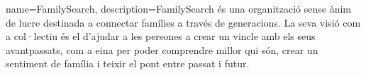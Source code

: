 {
	name=FamilySearch,
	description={FamilySearch és una organització sense ànim de lucre destinada a connectar famílies a través de generacions. La seva visió com a col·lectiu és el d'ajudar a les persones a crear un vincle amb els seus avantpassats, com a eina per poder comprendre millor qui són, crear un sentiment de família i teixir el pont entre passat i futur.}
}
